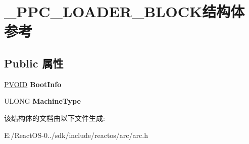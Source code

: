 \hypertarget{struct___p_p_c___l_o_a_d_e_r___b_l_o_c_k}{}\section{\+\_\+\+P\+P\+C\+\_\+\+L\+O\+A\+D\+E\+R\+\_\+\+B\+L\+O\+C\+K结构体 参考}
\label{struct___p_p_c___l_o_a_d_e_r___b_l_o_c_k}
\subsection*{Public 属性}
\begin{DoxyCompactItemize}
\item 
\mbox{\label{struct___p_p_c___l_o_a_d_e_r___b_l_o_c_k_a90c686c6d7ff414384a5ed147dcbc684}} 
\hyperlink{interfacevoid}{P\+V\+O\+ID} {\bfseries Boot\+Info}
\item 
\mbox{\label{struct___p_p_c___l_o_a_d_e_r___b_l_o_c_k_af2b62c21e5b898a461388c82222f6b07}} 
U\+L\+O\+NG {\bfseries Machine\+Type}
\end{DoxyCompactItemize}


该结构体的文档由以下文件生成\+:\begin{DoxyCompactItemize}
\item 
E\+:/\+React\+O\+S-\/0../sdk/include/reactos/arc/arc.\+h\end{DoxyCompactItemize}
